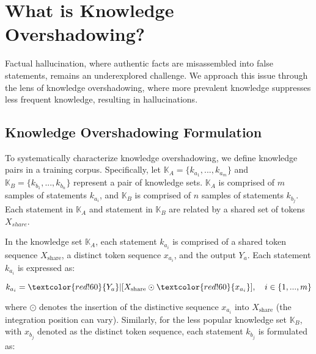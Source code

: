 \section{What is Knowledge Overshadowing?}
\label{sec:formulation}



Factual hallucination, where authentic facts are misassembled into false statements, remains an underexplored challenge. We approach this issue through the lens of knowledge overshadowing, where more prevalent knowledge suppresses less frequent knowledge, resulting in hallucinations.

\subsection{Knowledge Overshadowing Formulation}
\label{ssec:shadow_formulation}
To systematically characterize knowledge overshadowing, we define knowledge pairs in a training corpus.
Specifically, let $\mathbb{K}_A = \{k_{a_1}, ..., k_{a_m}\}$ and $\mathbb{K}_B = \{k_{b_1}, ..., k_{b_n}\}$ represent a pair of knowledge sets. $\mathbb{K}_A$ is comprised of $m$ samples of statements $k_{a_i}$, and $\mathbb{K}_B$ is comprised of $n$ samples of statements $k_{b_j}$.
Each statement in $\mathbb{K}_A$ and statement in $\mathbb{K}_B$ are related by a shared set of tokens $X_{share}$.

In the knowledge set $\mathbb{K}_A$, each statement $k_{a_i}$ is comprised of a shared token sequence $X_{\mathrm{share}}$, a distinct token sequence $x_{a_i}$, and the output $Y_a$. Each statement $k_{a_i}$ is expressed as:

\vspace{-0.5em}
\begin{small}
\begin{equation}
    k_{a_i} = \textcolor{red!60}{Y_a} | [X_{\mathrm{share}} \odot \textcolor{red!60}{x_{a_i}}], \quad i \in \{1, ..., m\}
\end{equation}
\end{small}

\vspace{-0.5em}\noindent where $\odot$ denotes the insertion of the distinctive sequence $x_{a_i}$ into $X_{\mathrm{share}}$
(the integration position can vary).
Similarly, for the less popular knowledge set $\mathbb{K}_B$, with $x_{b_j}$ denoted as the distinct token sequence, each statement $k_{b_j}$ is formulated as:

